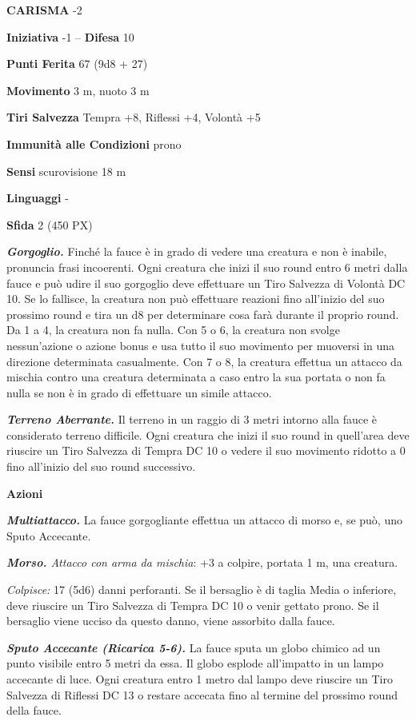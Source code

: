 \begin{multicols}{2}
\textbf{CARISMA} -2

\textbf{Iniziativa} -1 -- \textbf{Difesa} 10

\textbf{Punti Ferita} 67 (9d8 + 27)

\textbf{Movimento} 3 m, nuoto 3 m

\textbf{Tiri Salvezza} Tempra +8, Riflessi +4, Volontà +5

\textbf{Immunità alle Condizioni} prono

\textbf{Sensi} scurovisione 18 m

\textbf{Linguaggi} -

\textbf{Sfida} 2 (450 PX)

\textit{\textbf{Gorgoglio.}} Finché la fauce è in grado di vedere una creatura e non è inabile, pronuncia frasi incoerenti. Ogni creatura che inizi il suo round entro 6 metri dalla fauce e può udire il suo gorgoglio deve effettuare un Tiro Salvezza di Volontà DC 10. Se lo fallisce, la creatura non può effettuare reazioni fino all'inizio del suo prossimo round e tira un d8 per determinare cosa farà durante il proprio round. Da 1 a 4, la creatura non fa nulla. Con 5 o 6, la creatura non svolge nessun'azione o azione bonus e usa tutto il suo movimento per muoversi in una direzione determinata casualmente. Con 7 o 8, la creatura effettua un attacco da mischia contro una creatura determinata a caso entro la sua portata o non fa nulla se non è in grado di effettuare un simile attacco.

\textit{\textbf{Terreno Aberrante.}} Il terreno in un raggio di 3 metri intorno alla fauce è considerato terreno difficile. Ogni creatura che inizi il suo round in quell'area deve riuscire un Tiro Salvezza di Tempra DC 10 o vedere il suo movimento ridotto a 0 fino all'inizio del suo round successivo.

\textbf{Azioni}

\textit{\textbf{Multiattacco.}} La fauce gorgogliante effettua un attacco di morso e, se può, uno Sputo Accecante.

\textit{\textbf{Morso.} Attacco con arma da mischia}: +3 a colpire, portata 1 m, una creatura.

\textit{Colpisce:} 17 (5d6) danni perforanti. Se il bersaglio è di taglia Media o inferiore, deve riuscire un Tiro Salvezza di Tempra DC 10 o venir gettato prono. Se il bersaglio viene ucciso da questo danno, viene assorbito dalla fauce.

\textit{\textbf{Sputo Accecante (Ricarica 5-6).}} La fauce sputa un globo chimico ad un punto visibile entro 5 metri da essa. Il globo esplode all'impatto in un lampo accecante di luce. Ogni creatura entro 1 metro dal lampo deve riuscire un Tiro Salvezza di Riflessi DC 13 o restare accecata fino al termine del prossimo round della fauce.


\end{multicols}
